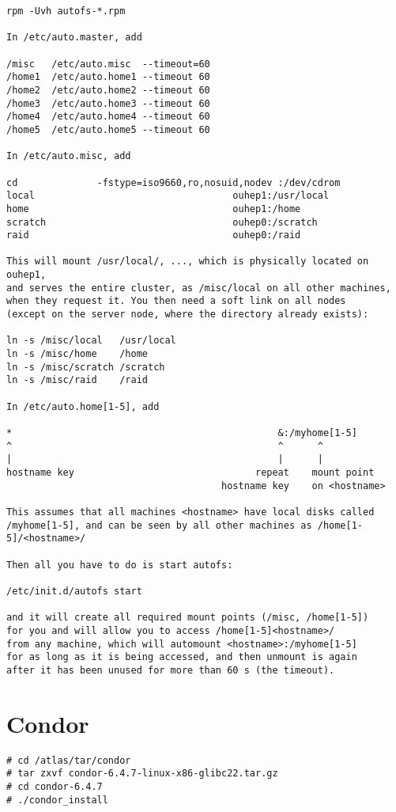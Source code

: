 \documentclass{revtex4}
\begin{document}
\begin{appendix}
\begin{verbatim}
rpm -Uvh autofs-*.rpm

In /etc/auto.master, add

/misc   /etc/auto.misc  --timeout=60
/home1  /etc/auto.home1 --timeout 60
/home2  /etc/auto.home2 --timeout 60
/home3  /etc/auto.home3 --timeout 60
/home4  /etc/auto.home4 --timeout 60
/home5  /etc/auto.home5 --timeout 60

In /etc/auto.misc, add

cd              -fstype=iso9660,ro,nosuid,nodev :/dev/cdrom
local                                   ouhep1:/usr/local
home                                    ouhep1:/home
scratch                                 ouhep0:/scratch
raid                                    ouhep0:/raid

This will mount /usr/local/, ..., which is physically located on ouhep1, 
and serves the entire cluster, as /misc/local on all other machines, 
when they request it. You then need a soft link on all nodes
(except on the server node, where the directory already exists):

ln -s /misc/local   /usr/local
ln -s /misc/home    /home
ln -s /misc/scratch /scratch
ln -s /misc/raid    /raid

In /etc/auto.home[1-5], add

*                                               &:/myhome[1-5]
^                                               ^      ^
|                                               |      |
hostname key                                repeat    mount point
                                      hostname key    on <hostname>

This assumes that all machines <hostname> have local disks called 
/myhome[1-5], and can be seen by all other machines as /home[1-5]/<hostname>/

Then all you have to do is start autofs:

/etc/init.d/autofs start

and it will create all required mount points (/misc, /home[1-5]) 
for you and will allow you to access /home[1-5]<hostname>/ 
from any machine, which will automount <hostname>:/myhome[1-5]
for as long as it is being accessed, and then unmount is again
after it has been unused for more than 60 s (the timeout).
\end{verbatim}

\newpage

\section{Condor \label{condor}}
\begin{verbatim}
# cd /atlas/tar/condor
# tar zxvf condor-6.4.7-linux-x86-glibc22.tar.gz 
# cd condor-6.4.7
# ./condor_install 


\end{verbatim}
\end{appendix}
\end{document}
